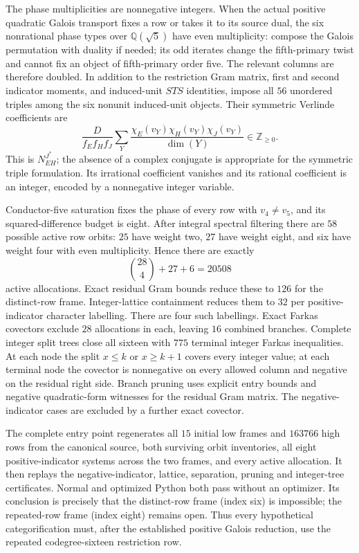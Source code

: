 The phase multiplicities are nonnegative integers.  When the actual
positive quadratic Galois transport fixes a row or takes it to its source dual,
the six nonrational phase types over $\mathbb Q(\sqrt5)$ have even
multiplicity: compose the Galois permutation with duality if needed;
its odd iterates change the fifth-primary twist and cannot fix an
object of fifth-primary order five.  The relevant columns are
therefore doubled.  In addition to the restriction Gram matrix,
first and second indicator moments, and induced-unit $STS$
identities, impose all $56$ unordered triples among the six nonunit
induced-unit objects.  Their symmetric Verlinde coefficients are
\[
 \frac{D}{f_Ef_Hf_J}\sum_Y
 \frac{\chi_E(v_Y)\chi_H(v_Y)\chi_J(v_Y)}{\dim(Y)}
       \in\mathbb Z_{\geq0}.
\]
This is $N_{EH}^{J^*}$; the absence of a complex conjugate is
appropriate for the symmetric triple formulation.  Its irrational
coefficient vanishes and its rational coefficient is an integer,
encoded by a nonnegative integer variable.

Conductor-five saturation fixes the phase of every row with
$v_4\ne v_5$, and its squared-difference budget is eight.
After integral spectral filtering there are $58$ possible active
row orbits: $25$ have weight two, $27$ have weight eight, and six
have weight four with even multiplicity.  Hence there are exactly
\[
 \binom{28}{4}+27+6=20508
\]
active allocations.  Exact residual Gram bounds reduce these to
$126$ for the distinct-row frame.  Integer-lattice containment
reduces them to $32$ per positive-indicator character labelling.
There are four such labellings.  Exact Farkas covectors exclude
$28$ allocations in each, leaving $16$ combined branches.  Complete
integer split trees close all sixteen with $775$ terminal integer
Farkas inequalities.  At each node the split $x\leq k$ or
$x\geq k+1$ covers every integer value; at each terminal node the
covector is nonnegative on every allowed column and negative on
the residual right side.  Branch pruning uses explicit entry
bounds and negative quadratic-form witnesses for the residual
Gram matrix.  The negative-indicator cases are excluded by a
further exact covector.

The complete entry point
regenerates all $15$ initial low frames and $163766$ high rows from
the canonical source, both surviving orbit inventories, all eight
positive-indicator systems across the two frames, and every active
allocation.  It then replays the negative-indicator, lattice,
separation, pruning and integer-tree certificates.  Normal and
optimized Python both pass without an optimizer.  Its conclusion
is precisely that the distinct-row frame (index six) is impossible;
the repeated-row frame (index eight) remains open.  Thus every
hypothetical categorification must, after the established positive
Galois reduction, use the repeated codegree-sixteen restriction row.

